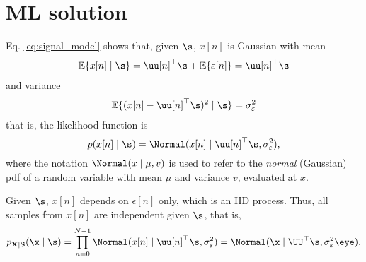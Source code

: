 

\section{ML solution}

Eq. \eqref{eq:signal_model} shows that, given $\s$, $x[n]$ is Gaussian with mean
\begin{align}
\EE\{x[n] \mid \s \} = \uu[n]^\top \s + \EE\{\varepsilon[n]\} = \uu[n]^\top \s 
\end{align}
and variance
\begin{align}
\EE\{(x[n]-\uu[n]^\top \s)^2 \mid\s \} = \sigma_\varepsilon^2 
\end{align}
that is, the likelihood function is
\begin{equation}
p(x[n] \mid \s ) = \Normal(x[n] \mid \uu[n]^\top\s, \sigma_\varepsilon^2),
\end{equation}
where the notation $\Normal(x \mid \mu, v) $ is used to refer to the \emph{normal} (Gaussian) pdf of a random variable with mean $\mu$ and variance $v$, evaluated at $x$.

Given $\s$, $x[n]$ depends on $\epsilon[n]$ only, which is an IID process. Thus, all samples from $x[n]$ are independent given $\s$, that is,
\begin{equation}
p_{{\bf X}|{\bf S}}(\x \mid \s) = \prod_{n=0}^{N-1} \Normal(x[n] \mid \uu[n]^\top\s, \sigma_\varepsilon^2) 
           = \Normal(\x \mid \UU^\top\s, \sigma_\varepsilon^2\eye).
\end{equation}

